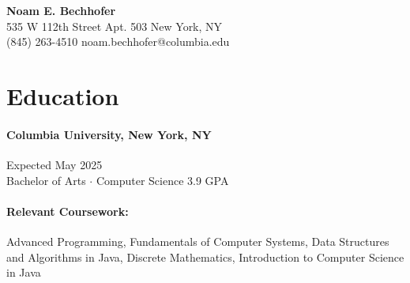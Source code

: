 \documentclass[12pt]{article}
\begin{document}
\pagestyle{fancy}
\fancyhf{} %
\renewcommand{\headrulewidth}{0pt} %


\begin{center}
    \begin{Large}
        \textbf{Noam E. Bechhofer}
        \\
        {\small 535 W 112th Street \quad Apt. 503 \quad New York, NY}
        \\
        (845) 263-4510 \quad noam.bechhofer@columbia.edu
    \end{Large}
\end{center}


\vfill
\section*{Education}

\paragraph*{Columbia University, New York, NY} \hfill Expected May 2025
\\
Bachelor of Arts $\cdot$ Computer Science \hfill 3.9 GPA

\paragraph*{Relevant Coursework: }
Advanced Programming, Fundamentals of Computer Systems, Data Structures and
Algorithms in Java, Discrete Mathematics, Introduction to Computer Science in
Java

\end{document}

